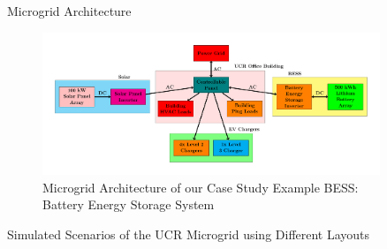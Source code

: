 \documentclass[final, 36 pt]{beamer}
\newlength{\sepwid}
\newlength{\onecolwid}
\newlength{\twocolwid}
\begin{document}
\begin{frame}[t]
\begin{columns}[t]
\begin{column}{\onecolwid}

\end{column} %

\begin{column}{\sepwid}\end{column} %

\begin{column}{\twocolwid} %


\begin{block}{Microgrid Architecture}
	\begin{figure}[!htb] 		
		\includegraphics[width=\linewidth]{Fig/power_system_setup_modelica_large}
		\caption{\large Microgrid Architecture of our Case Study Example BESS: Battery Energy Storage System}
		\label{fig:powersystemsetupfull}
	\end{figure}
\end{block}

\begin{block}{Simulated Scenarios of the UCR Microgrid using Different Layouts}
	
	\begin{table}
		\caption{}
		\centering
		
		\label{tab:scenarios}
	\end{table}
	
\end{block}


\end{column}
\end{columns}
\end{frame}
\end{document}
